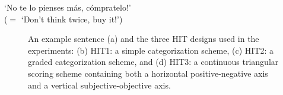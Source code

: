 \documentclass[11pt,letterpaper]{article}
\begin{document}
\begin{li}
  \label{ex}
  `No te lo pienses m\'{a}s, c\'{o}mpratelo!'\\
  ($=$ `Don't think twice, buy it!')
\end{li}

\begin{figure}[t]
  \begin{center}
	\caption{An example sentence (a) and the three HIT designs used in the experiments: (b) HIT1: a simple categorization scheme, (c) HIT2: a graded categorization scheme, and (d) HIT3: a continuous triangular scoring scheme containing both a horizontal positive-negative axis and a vertical subjective-objective axis.}
	\label{hits}
  \end{center}
\end{figure}
\end{document}

